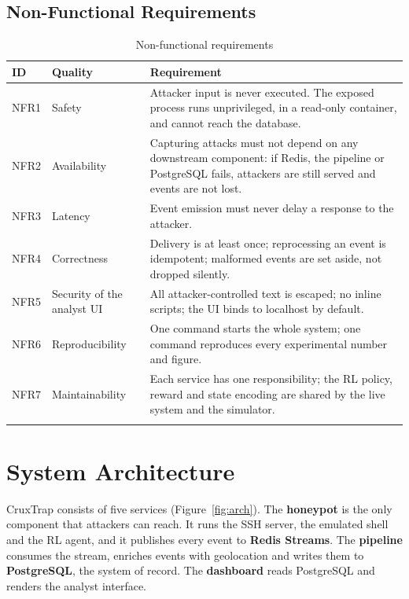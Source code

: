 \subsection{Non-Functional Requirements}

\begin{longtable}{@{}p{1.5cm}p{3cm}p{9.3cm}@{}}
\toprule
\textbf{ID} & \textbf{Quality} & \textbf{Requirement} \\
\midrule
\endhead
NFR1 & Safety & Attacker input is never executed. The exposed process runs unprivileged, in a read-only container, and cannot reach the database. \\
NFR2 & Availability & Capturing attacks must not depend on any downstream component: if Redis, the pipeline or PostgreSQL fails, attackers are still served and events are not lost. \\
NFR3 & Latency & Event emission must never delay a response to the attacker. \\
NFR4 & Correctness & Delivery is at least once; reprocessing an event is idempotent; malformed events are set aside, not dropped silently. \\
NFR5 & Security of the analyst UI & All attacker-controlled text is escaped; no inline scripts; the UI binds to localhost by default. \\
NFR6 & Reproducibility & One command starts the whole system; one command reproduces every experimental number and figure. \\
NFR7 & Maintainability & Each service has one responsibility; the RL policy, reward and state encoding are shared by the live system and the simulator. \\
\bottomrule
\caption{Non-functional requirements}
\label{tab:nfr}
\end{longtable}

\section{System Architecture}

CruxTrap consists of five services (Figure~\ref{fig:arch}). The \textbf{honeypot} is the only
component that attackers can reach. It runs the SSH server, the emulated shell and the RL
agent, and it publishes every event to \textbf{Redis Streams}. The \textbf{pipeline} consumes
the stream, enriches events with geolocation and writes them to \textbf{PostgreSQL}, the system
of record. The \textbf{dashboard} reads PostgreSQL and renders the analyst interface.

